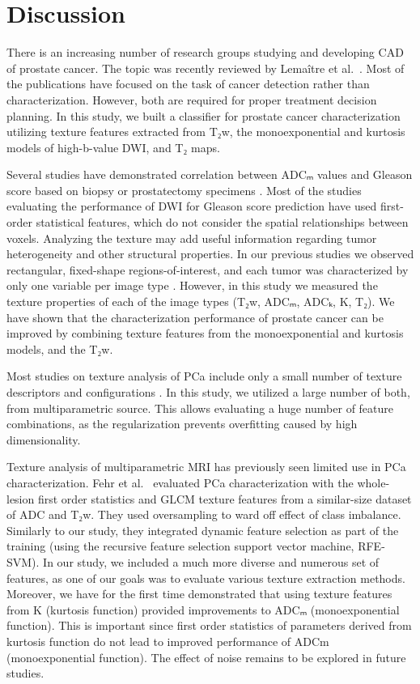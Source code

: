 \section{Discussion}

There is an increasing number of research groups studying and developing CAD of
prostate cancer. The topic was recently reviewed by Lemaître et
al.\ \cite{Lemaitre2015}. Most of the publications have focused on the task of
cancer detection rather than characterization. However, both are required for
proper treatment decision planning. In this study, we built a classifier for
prostate cancer characterization utilizing texture features extracted from T₂w,
the monoexponential and kurtosis models of high-b-value DWI, and T₂ maps.

Several studies have demonstrated correlation between ADCₘ values and Gleason
score based on biopsy \citep{Turkbey2011, Tamada2008} or prostatectomy specimens
\citep{Toivonen2015, Peng2013, Boesen2015, Rosenkrantz2015, Donati2014}. Most of
the studies evaluating the performance of DWI for Gleason score prediction have
used first-order statistical features, which do not consider the spatial
relationships between voxels. Analyzing the texture may add useful information
regarding tumor heterogeneity and other structural properties. In our previous
studies we observed rectangular, fixed-shape regions-of-interest, and each tumor
was characterized by only one variable per image type \citep{Toivonen2015,
Jambor2015Relaxation, Jambor2015Rotating}. However, in this study we measured
the texture properties of each of the image types (T₂w, ADCₘ, ADCₖ, K, T₂).
We have shown that the characterization performance of prostate cancer can be
improved by combining texture features from the monoexponential and kurtosis
models, and the T₂w.

Most studies on texture analysis of PCa include only a small number of texture
descriptors and configurations \citep{Kwak2015, Viswanath2012, Ginsburg2014}. In
this study, we utilized a large number of both, from multiparametric source.
This allows evaluating a huge number of feature combinations, as the
regularization prevents overfitting caused by high dimensionality.

Texture analysis of multiparametric MRI has previously seen limited use in PCa
characterization. Fehr et al.\ \cite{Fehr2015} evaluated PCa characterization
with the whole-lesion first order statistics and GLCM texture features from a
similar-size dataset of ADC and T₂w. They used oversampling to ward off effect
of class imbalance. Similarly to our study, they integrated dynamic feature
selection as part of the training (using the recursive feature selection support
vector machine, RFE-SVM). In our study, we included a much more diverse and
numerous set of features, as one of our goals was to evaluate various texture
extraction methods. Moreover, we have for the first time demonstrated that using
texture features from K (kurtosis function) provided improvements to ADCₘ
(monoexponential function). This is important since first order statistics of
parameters derived from kurtosis function do not lead to improved performance of
ADCm (monoexponential function). The effect of noise remains to be explored in
future studies.

